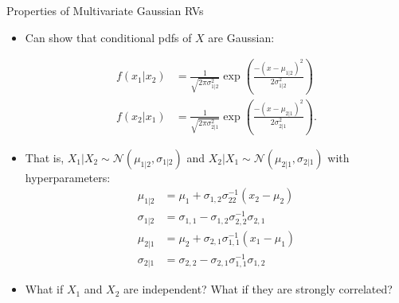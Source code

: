 \documentclass[9pt]{beamer}
\begin{document}
%
\begin{frame}{Properties of Multivariate Gaussian RVs}

\begin{itemize}
\setlength{\itemsep}{10pt}
\item Can show that conditional pdfs of $X$ are Gaussian:
\begin{block}{}
\begin{align*}
f(x_1|x_2)&=\frac{1}{\sqrt{2\pi\sigma_{1|2}^2}}\exp \left({\frac{-(x-\mu_{1|2})^2}{2\sigma_{1|2}^2}}\right)\\
f(x_2|x_1)&=\frac{1}{\sqrt{2\pi\sigma_{2|1}^2}}\exp \left({\frac{-(x-\mu_{2|1})^2}{2\sigma_{2|1}^2}}\right).
\end{align*} 
\end{block}
\item That is, $X_1|X_2\sim \mathcal{N}(\mu_{1|2},\sigma_{1|2})$ and $X_2|X_1\sim \mathcal{N}(\mu_{2|1},\sigma_{2|1})$ with hyperparameters:
\begin{align*}
\mu_{1|2}&=\mu_1+\sigma_{1,2}\sigma_{22}^{-1}(x_2-\mu_2)\\
\sigma_{1|2}&=\sigma_{1,1}-\sigma_{1,2}\sigma_{2,2}^{-1}\sigma_{2,1}\\
\mu_{2|1}&=\mu_2+\sigma_{2,1}\sigma_{1,1}^{-1}(x_1-\mu_1)\\
\sigma_{2|1}&=\sigma_{2,2}-\sigma_{2,1}\sigma_{1,1}^{-1}\sigma_{1,2}
\end{align*}
\item What  if $X_1$ and $X_2$ are independent? What  if they are strongly correlated?
\end{itemize}

\end{frame}
\end{document}
